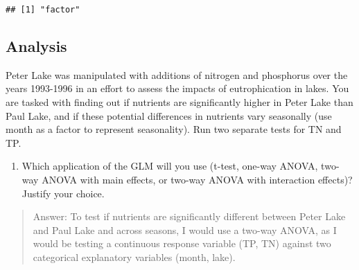 \documentclass[]{article}
\newenvironment{Shaded}{\begin{snugshade}}{\end{snugshade}}
\newcommand{\DecValTok}[1]{\textcolor[rgb]{0.00,0.00,0.81}{#1}}
\newcommand{\KeywordTok}[1]{\textcolor[rgb]{0.13,0.29,0.53}{\textbf{#1}}}
\newcommand{\NormalTok}[1]{#1}
\newcommand{\OperatorTok}[1]{\textcolor[rgb]{0.81,0.36,0.00}{\textbf{#1}}}
\newcommand{\StringTok}[1]{\textcolor[rgb]{0.31,0.60,0.02}{#1}}
\providecommand{\tightlist}{%
  \setlength{\itemsep}{0pt}\setlength{\parskip}{0pt}}
\begin{document}
\begin{Shaded}
\end{Shaded}

\begin{verbatim}
## [1] "factor"
\end{verbatim}

\hypertarget{analysis}{%
\subsection{Analysis}\label{analysis}}

Peter Lake was manipulated with additions of nitrogen and phosphorus
over the years 1993-1996 in an effort to assess the impacts of
eutrophication in lakes. You are tasked with finding out if nutrients
are significantly higher in Peter Lake than Paul Lake, and if these
potential differences in nutrients vary seasonally (use month as a
factor to represent seasonality). Run two separate tests for TN and TP.

\begin{enumerate}
\def\labelenumi{\arabic{enumi}.}
\setcounter{enumi}{3}
\tightlist
\item
  Which application of the GLM will you use (t-test, one-way ANOVA,
  two-way ANOVA with main effects, or two-way ANOVA with interaction
  effects)? Justify your choice.
\end{enumerate}

\begin{quote}
Answer: To test if nutrients are significantly different between Peter
Lake and Paul Lake and across seasons, I would use a two-way ANOVA, as I
would be testing a continuous response variable (TP, TN) against two
categorical explanatory variables (month, lake).
\end{quote}
\end{document}
